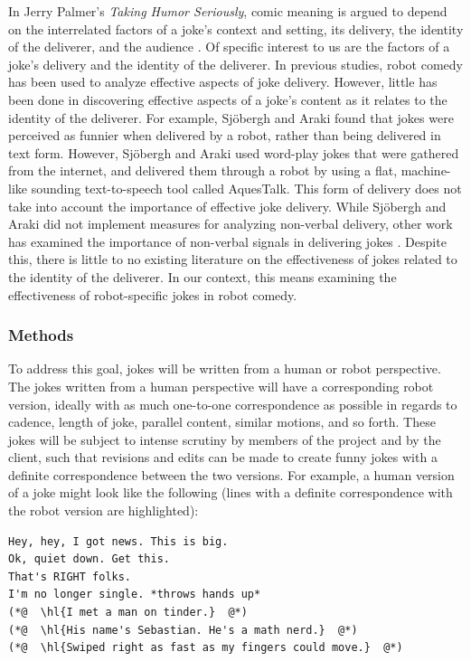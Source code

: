 \documentclass[onecolumn, draftclsnofoot,10pt, compsoc]{IEEEtran}
\begin{document}
In Jerry Palmer's \textit{Taking Humor Seriously}, comic meaning is argued to depend on the interrelated factors of a joke's context and setting, its delivery, the identity of the deliverer, and the audience \cite{Palmer:1993}.
Of specific interest to us are the factors of a joke's delivery and the identity of the deliverer.
In previous studies, robot comedy has been used to analyze effective aspects of joke delivery.
However, little has been done in discovering effective aspects of a joke's content as it relates to the identity of the deliverer.
For example, Sj\"{o}bergh and Araki \cite{RobotsMakeThings:2008} found that jokes were perceived as funnier when delivered by a robot, rather than being delivered in text form.
However, Sj\"{o}bergh and Araki used word-play jokes that were gathered from the internet, and delivered them through a robot by using a flat, machine-like sounding text-to-speech tool called AquesTalk. This form of delivery does not take into account the importance of effective joke delivery. While Sj\"{o}bergh and Araki did not implement measures for analyzing non-verbal delivery, other work has examined the importance of non-verbal signals in delivering jokes \cite{KatevasRobot:2014} \cite{KnightEightLessons:2011}.
Despite this, there is little to no existing literature on the effectiveness of jokes related to the identity of the deliverer.
In our context, this means examining the effectiveness of robot-specific jokes in robot comedy.

\subsubsection{Methods}
To address this goal, jokes will be written from a human or robot perspective. The jokes written from a human
perspective will have a corresponding robot version, ideally with as much one-to-one correspondence as possible in
regards to cadence, length of joke, parallel content, similar motions, and so forth. These jokes will be subject to intense
scrutiny by members of the project and by the client, such that revisions and edits can be made to create funny jokes
with a definite correspondence between the two versions. For example, a human version of a joke might look like the
following (lines with a definite correspondence with the robot version are highlighted):

\begin{lstlisting}
Hey, hey, I got news. This is big.
Ok, quiet down. Get this.
That's RIGHT folks.
I'm no longer single. *throws hands up*
(*@  \hl{I met a man on tinder.}  @*)
(*@  \hl{His name's Sebastian. He's a math nerd.}  @*)
(*@  \hl{Swiped right as fast as my fingers could move.}  @*)
\end{lstlisting}
\end{document}
